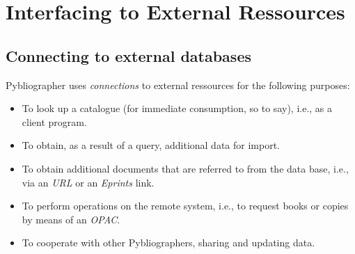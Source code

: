 
\section{Interfacing to  External Ressources}
\label{sec:external}





\subsection{Connecting to external databases}
\label{sec:extconn}

Pybliographer uses \textit{connections} to external ressources for the
following purposes:
\begin{itemize}
\item To look up a catalogue (for immediate consumption, so to say),
  i.e., as a client program.
\item To obtain, as a result of a query, additional data for import.
\item To obtain additional documents that are referred to from the
  data base, i.e., via an \textit{URL} or an \textit{Eprints} link.
\item To perform operations on the remote system, i.e., to request
  books or copies by means of an \textit{OPAC}. 
\item \Think To cooperate with other Pybliographers, sharing and
  updating data.

\end{itemize}














